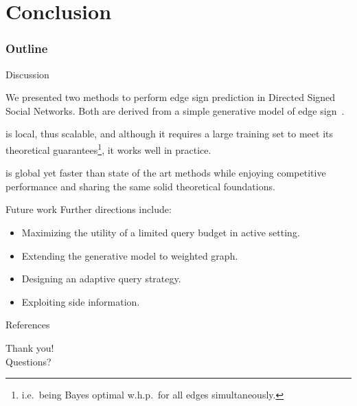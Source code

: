 \documentclass[10pt,svgnames,ignorenonframetext,final]{beamer}
\providecommand{\largelist}{%
  \setlength{\itemsep}{8pt}\setlength{\parskip}{3pt}}
\begin{document}
\section{Conclusion}\label{conclusion}
  \begin{frame} \frametitle{Outline} \tableofcontents[currentsection] \end{frame}

\begin{frame}{Discussion}

We presented two methods to perform edge sign prediction in Directed Signed
Social Networks. Both are derived from a simple generative model of edge
sign~\autocite{trollsNIPS16}.

\alert{\usrule{} is local}, thus scalable, and although it requires a large training
set to meet its theoretical guarantees\footnote{i.e.~being Bayes optimal
w.h.p.~for all edges simultaneously.}, it works well in practice.

\alert{\uslpropGsec{} is global} yet faster than state of the art
methods while enjoying competitive performance and sharing the same
solid theoretical foundations.

\end{frame}
\begin{frame}{Future work}
Further directions include:

\begin{itemize}
  \largelist
  \item
    Maximizing the utility of a limited query budget in active setting.
  \item
    Extending the generative model to weighted graph.
  \item
    Designing an adaptive query strategy.
  \item
    Exploiting side information.
\end{itemize}

\end{frame}


\begin{frame}[allowframebreaks]{References}
  \printbibliography
\end{frame}

\begin{frame}[plain,c]

\begin{center}
\Huge Thank you! \\ Questions?
\end{center}

\end{frame}
\end{document}
